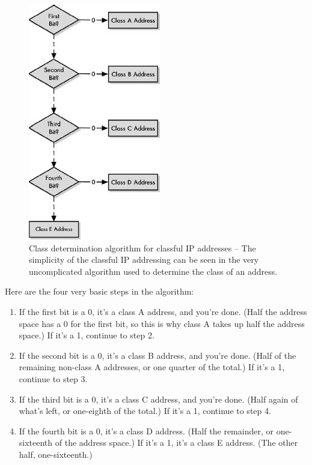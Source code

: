 \begin{figure}
   \centering
   \includegraphics[width=.5\textwidth]{images/class-determination.jpg}
   \caption[Class determination algorithm for classful IP addresses]{Class determination algorithm for classful IP addresses -- The simplicity of the classful IP addressing can be seen in the very uncomplicated algorithm used to determine the class of an address.}
   \label{fig:class-determination}
\end{figure}


Here are the four very basic steps in the algorithm:

\begin{enumerate}
   \item
      If the first bit is a 0, it's a class A address, and you're done.
      (Half the address space has a 0 for the first bit, so this is why class A takes up half the address space.)
      If it's a 1, continue to step 2.
   \item
      If the second bit is a 0, it's a class B address, and you're done.
      (Half of the remaining non-class A addresses, or one quarter of the total.)
      If it's a 1, continue to step 3.
   \item
      If the third bit is a 0, it's a class C address, and you're done.
      (Half again of what's left, or one-eighth of the total.) 
      If it's a 1, continue to step 4.
   \item
      If the fourth bit is a 0, it's a class D address.
      (Half the remainder, or one-sixteenth of the address space.) 
      If it's a 1, it's a class E address.
      (The other half, one-sixteenth.)
\end{enumerate}

